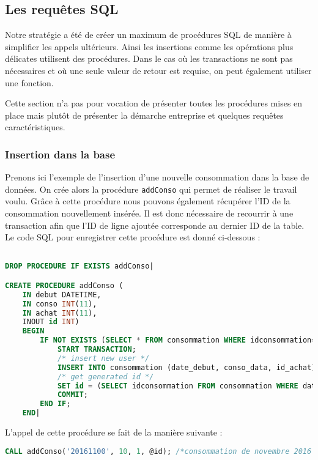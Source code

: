 \subsection{Les requêtes SQL}
Notre stratégie a été de créer un maximum de procédures SQL de manière à simplifier les appels ultérieurs. Ainsi les insertions comme les opérations plus délicates utilisent des procédures.
Dans le cas où les transactions ne sont pas nécessaires et où une seule valeur de retour est requise, on peut également utiliser une fonction.

Cette section n'a pas pour vocation de présenter toutes les procédures mises en place mais plutôt de présenter la démarche entreprise et quelques requêtes caractéristiques.
\subsubsection{Insertion dans la base}
Prenons ici l'exemple de l'insertion d'une nouvelle consommation dans la base de données. On crée alors la procédure \texttt{addConso} qui permet de réaliser le travail voulu. Grâce à cette procédure nous pouvons également récupérer l'ID de la consommation nouvellement insérée.
Il est donc nécessaire de recourrir à une transaction afin que l'ID de ligne ajoutée corresponde au dernier ID de la table. Le code SQL pour enregistrer cette procédure est donné ci-dessous :

\begin{lstlisting}[language=sql]

DROP PROCEDURE IF EXISTS addConso|

CREATE PROCEDURE addConso (
    IN debut DATETIME,
    IN conso INT(11),
    IN achat INT(11),
    INOUT id INT)
    BEGIN
        IF NOT EXISTS (SELECT * FROM consommation WHERE idconsommation=id AND date_debut=debut AND id_achat=achat) THEN
            START TRANSACTION;
			/* insert new user */
        	INSERT INTO consommation (date_debut, conso_data, id_achat) VALUES (debut, conso, achat);
			/* get generated id */
        	SET id = (SELECT idconsommation FROM consommation WHERE date_debut=debut AND conso_data=conso AND id_achat=achat ORDER BY idconsommation DESC LIMIT 1);
            COMMIT;
		END IF;
    END|

\end{lstlisting}

L'appel de cette procédure se fait de la manière suivante :

\begin{lstlisting}[language=sql]
CALL addConso('20161100', 10, 1, @id); /*consommation de novembre 2016 pour l'achat dont l'ID est 1*/
\end{lstlisting}

